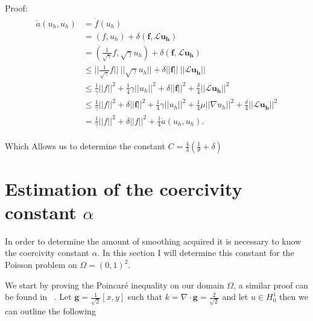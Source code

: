 Proof:
\begin{align}
	\begin{split}
	\mathring{a}(u_h,u_h) &= \mathring{f}(u_h) \\
	&= (f,u_h) + \delta(\mathbf{f},\mathcal{L}\mathbf{u_h}) \\
	&= (\frac{1}{\sqrt{\gamma}}f,\sqrt{\gamma}u_h) + \delta(\mathbf{f},\mathcal{L}\mathbf{u_h}) \\
	&\leq ||\frac{1}{\sqrt{\gamma}}f||\:||\sqrt{\gamma}u_h||+\delta||\mathbf{f}||\:||\mathcal{L}\mathbf{u_h}|| \\
	&\leq \frac{1}{\gamma}||f||^2 + \frac{1}{4}\gamma||u_h||^2 + \delta||\mathbf{f}||^2 + \frac{\delta}{4}||\mathcal{L}\mathbf{u_h}||^2 \\
	&\leq \frac{1}{\gamma}||f||^2 + \delta||\mathbf{f}||^2 + \frac{1}{4}\gamma||u_h||^2 + \frac{1}{4}\mu||\nabla u_h||^2 + \frac{\delta}{4}||\mathcal{L}\mathbf{u_h}||^2 \\
	&= \frac{1}{\gamma}||f||^2 + \delta||f||^2 + \frac{1}{4}\mathring{a}(u_h,u_h).
	\end{split}
	\label{eq:derivationStabilityResult}
\end{align}

Which Allows us to determine the constant $C= \frac{4}{3}(\frac{1}{\theta}+\delta)$






\section{Estimation of the coercivity constant $\alpha$}

In order to determine the amount of smoothing acquired it is necessary to know the coercivity constant $\alpha$. In this section I will determine this constant for the Poisson problem on $\Omega = (0,1)^2$.

We start by proving the Poincar\'e inequality on our domain $ \Omega $, a similar proof can be found in ~\cite{Quarteroni}. Let $\mathbf{g} = \frac{1}{\sqrt{2}}[x,y]$ such that $k = \nabla \cdot \mathbf{g}=\frac{2}{\sqrt{2}}$ and let $u \in H_0^1$ then we can outline the following

